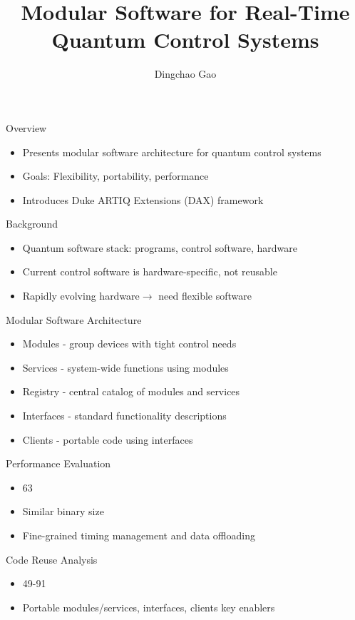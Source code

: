 \documentclass[18 pt]{beamer}
\title{Modular Software for Real-Time Quantum Control Systems}
\author[Gcc]{Dingchao Gao}
\institute[ISCAS]{Institute of Software Chinese Academy of Sciences}
\begin{document}
\frame{\titlepage}

\begin{frame}{Overview}
\begin{itemize}
\item Presents modular software architecture for quantum control systems
\item Goals: Flexibility, portability, performance
\item Introduces Duke ARTIQ Extensions (DAX) framework
\end{itemize}
\end{frame}

\begin{frame}{Background}
\begin{itemize}
\item Quantum software stack: programs, control software, hardware
\item Current control software is hardware-specific, not reusable
\item Rapidly evolving hardware\(\rightarrow\) need flexible software
\end{itemize}
\end{frame}

\begin{frame}{Modular Software Architecture}
\begin{itemize}
\item Modules - group devices with tight control needs
\item Services - system-wide functions using modules
\item Registry - central catalog of modules and services
\item Interfaces - standard functionality descriptions

\item Clients - portable code using interfaces
\end{itemize}
\end{frame}

\begin{frame}{Performance Evaluation}
\begin{itemize}
\item 63%
\item Similar binary size
\item Fine-grained timing management and data offloading
\end{itemize}
\end{frame}

\begin{frame}{Code Reuse Analysis}
\begin{itemize}
\item 49-91%
\item Portable modules/services, interfaces, clients key enablers
\end{itemize}
\end{frame}
\end{document}
